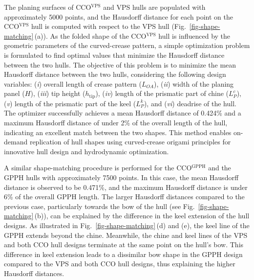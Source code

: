 The planing surfaces of CCO\(^\textrm{VPS}\) and VPS hulls are populated with approximately 5000 points, and the Hausdorff distance for each point on the CCO\(^\textrm{VPS}\) hull is computed with respect to the VPS hull (Fig.~\ref{fig-shape-matching}\,(a)). As the folded shape of the CCO\(^\textrm{VPS}\) hull is influenced by the geometric parameters of the curved-crease pattern, a simple optimization problem is formulated to find optimal values that minimize the Hausdorff distance between the two hulls. The objective of this problem is to minimize the mean Hausdorff distance between the two hulls, considering the following design variables: \mbox{(\textit{i}\hspace{.5pt})} overall length of crease pattern (\(L_{OA}\)), \mbox{(\textit{ii}\hspace{.5pt})} width of the planing panel (\(H\)), \mbox{(\textit{iii}\hspace{.5pt})} tip height (\(h_\textrm{tip}\)), \mbox{(\textit{iv}\hspace{.5pt})} length of the prismatic part of chine (\(L_P^c\)), \mbox{(\textit{v}\hspace{.5pt})} length of the prismatic part of the keel (\(L_P^k\)), and  \mbox{(\textit{vi}\hspace{.5pt})} deadrise of the hull. The optimizer successfully achieves a mean Hausdorff distance of 0.424\% and a maximum Hausdorff distance of under 2\% of the overall length of the hull, indicating an excellent match between the two shapes. This method enables on-demand replication of hull shapes using curved-crease origami principles for innovative hull design and hydrodynamic optimization.

A similar shape-matching procedure is performed for the CCO\(^\textrm{GPPH}\) and the GPPH hulls with approximately 7500 points. In this case, the mean Hausdorff distance is observed to be 0.471\%, and the maximum Hausdorff distance is under 6\% of the overall GPPH length. The larger Hausdorff distances compared to the previous case, particularly towards the bow of the hull (see Fig.~\ref{fig-shape-matching}\,(b)), can be explained by the difference in the keel extension of the hull designs. As illustrated in Fig.~\ref{fig-shape-matching}\,(d) and (e), the keel line of the GPPH extends beyond the chine. Meanwhile, the chine and keel lines of the VPS and both CCO hull designs terminate at the same point on the hull's bow. This difference in keel extension leads to a dissimilar bow shape in the GPPH design compared to the VPS and both CCO hull designs, thus explaining the higher Hausdorff distances.

